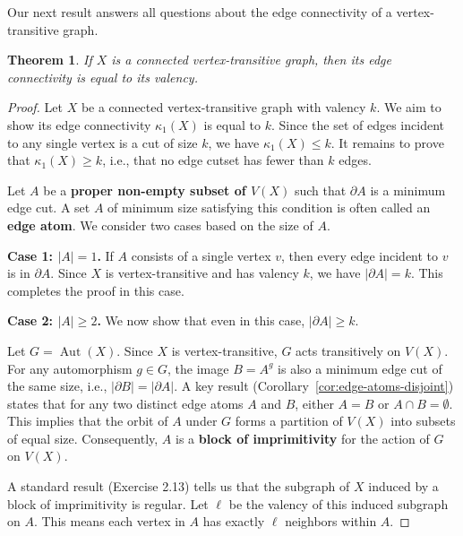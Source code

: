 \documentclass[12pt,a4paper,openany]{book}
\newtheorem{theorem}{Theorem}[section]
\begin{document}
Our next result answers all questions about the edge connectivity of a vertex-transitive graph.

\begin{theorem}\label{lem:edge-connectivity-equals-valency}
If $X$ is a connected vertex-transitive graph, then its edge connectivity is equal to its valency.
\end{theorem}
\begin{proof}
Let $X$ be a connected vertex-transitive graph with valency $k$. We aim to show its edge connectivity $\kappa_1(X)$ is equal to $k$. Since the set of edges incident to any single vertex is a cut of size $k$, we have $\kappa_1(X) \leq k$. It remains to prove that $\kappa_1(X) \geq k$, i.e., that no edge cutset has fewer than $k$ edges.

Let $A$ be a \textbf{proper non-empty subset of $V(X)$} such that $\partial A$ is a minimum edge cut. A set $A$ of minimum size satisfying this condition is often called an \textbf{edge atom}. We consider two cases based on the size of $A$.

\noindent\textbf{Case 1: $|A| = 1$.}
If $A$ consists of a single vertex $v$, then every edge incident to $v$ is in $\partial A$. Since $X$ is vertex-transitive and has valency $k$, we have $|\partial A| = k$. This completes the proof in this case.

\noindent\textbf{Case 2: $|A| \geq 2$.}
We now show that even in this case, $|\partial A| \geq k$.

Let $G = \operatorname{Aut}(X)$. Since $X$ is vertex-transitive, $G$ acts transitively on $V(X)$. For any automorphism $g \in G$, the image $B = A^g$ is also a minimum edge cut of the same size, i.e., $|\partial B| = |\partial A|$. A key result (Corollary~\ref{cor:edge-atoms-disjoint}) states that for any two distinct edge atoms $A$ and $B$, either $A = B$ or $A \cap B = \emptyset$. This implies that the orbit of $A$ under $G$ forms a partition of $V(X)$ into subsets of equal size. Consequently, $A$ is a \textbf{block of imprimitivity} for the action of $G$ on $V(X)$.

A standard result (Exercise 2.13) tells us that the subgraph of $X$ induced by a block of imprimitivity is regular. Let $\ell$ be the valency of this induced subgraph on $A$. This means each vertex in $A$ has exactly $\ell$ neighbors within $A$.


\end{proof}
\end{document}

